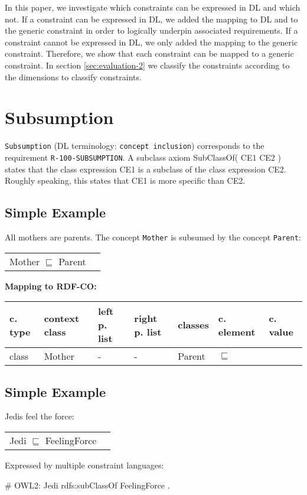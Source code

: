 \documentclass{llncs}
\newcommand{\ms}[1]{\texttt{#1}}
\newenvironment{gcotable}{
  \scriptsize
  \sffamily
  \vspace{0cm}
	\begin{center}
	\textbf{\vspace{0.4cm}Mapping to RDF-CO:} \\
  \begin{tabular}{l|l|l|l|l|l|l}
	\hline
  \textbf{c. type} & \textbf{context class} & \textbf{left p. list} & \textbf{right p. list} & \textbf{classes} & \textbf{c. element} & \textbf{c. value} \\
  \hline

}{
  \hline
  \end{tabular}
	\end{center}
}
\newenvironment{DL}{
  \vspace{0cm}
	\begin{center}
  \begin{tabular}{r l}

}{
  \end{tabular}
	\end{center}
}
\begin{document}
In this paper, we investigate which constraints can be expressed in DL and which not.
If a constraint can be expressed in DL, we added the mapping to DL and to the generic constraint in order to logically underpin associated requirements.
If a constraint cannot be expressed in DL, we only added the mapping to the generic constraint.
Therefore, we show that each constraint can be mapped to a generic constraint.
In section \ref{sec:evaluation-2} we classify the constraints according to the dimensions to classify constraints.

\section{Subsumption}

\ms{Subsumption} (DL terminology: \ms{concept inclusion}) corresponds to the requirement \ms{R-100-SUBSUMPTION}.
A subclass axiom SubClassOf( CE1 CE2 ) states that the class expression CE1 is a subclass of the class expression CE2. 
Roughly speaking, this states that CE1 is more specific than CE2.

\subsection{Simple Example}

All mothers are parents.
The concept \ms{Mother} is subsumed by the concept \ms{Parent}:

\begin{DL}
Mother $\sqsubseteq$ Parent \\
\end{DL}

\begin{gcotable}
class & Mother & - & - & Parent & $\sqsubseteq$ \\
\end{gcotable}

\subsection{Simple Example}

Jedis feel the force:

\begin{DL}
Jedi $\sqsubseteq$ FeelingForce
\end{DL}

Expressed by multiple constraint languages:

\begin{ex}
# OWL2:
Jedi rdfs:subClassOf FeelingForce .
\end{ex}
\end{document}
